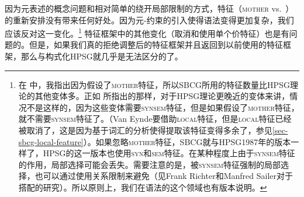 因为元表述的概念问题和相对简单的绕开局部限制的方式，特征（\textsc{mother} vs.\ \synsemc）的重新安排没有带来任何好处。因为元-约束的引入使得语法变得更加复杂，我们应该反对这一变化。\footnote{%
  在 中，我指出因为假设了\textsc{mother}特征，所以SBCG所用的特征数量比HPSG理论的其他变体多。正如 \citet{VanEynde2015a}所指出的那样，对于HPSG理论更晚近的变体来讲，情况不是这样的，因为这些变体需要\textsc{synsem}特征，但是如果假设了\textsc{mother}特征，就不需要\textsc{synsem}特征了。（Van Eynde要借助\textsc{local}特征，但是\textsc{local}特征已经被取消了，这是因为基于词汇的分析使得提取该特征变得多余了，参见\ref{sec-sbcg-local-feature}）。如果忽略\textsc{mother}特征，SBCG就与HPSG1987年的版本\citep{ps}一样了，HPSG的这一版本也使用\textsc{syn}和\textsc{sem}特征。在某种程度上由于\textsc{synsem}特征的作用，局部选择可能会丢失\citep[]{Sag2012a}。需要注意的是，被\textsc{synsem}特征强制的局部选择，也可以通过使用关系限制来避免（见Frank Richter和Manfred Sailer对于搭配的研究\citep{RS99b-u,SS2003a}）。所以原则上，我们在语法的这个领域也有版本说明。%
} 特征框架中的其他变化（取消\localfc 和使用单个价特征）也是有问题的。但是，如果我们真的拒绝调整后的特征框架并且返回到以前使用的特征框架，那么\sbcgc 与构式化HPSG\citep{Sag97a}就几乎是无法区分的了。

